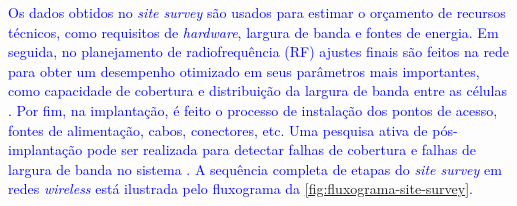 \textcolor{blue}{Os dados obtidos no \textit{site survey} são usados para estimar o orçamento de recursos técnicos, como requisitos de \textit{hardware}, largura de banda e fontes de energia.
Em seguida, no planejamento de radiofrequência (RF) ajustes finais são feitos na rede para obter um desempenho otimizado em seus parâmetros mais importantes, como capacidade de cobertura e distribuição da largura de banda entre as células \cite{kar2018ieee}. Por fim, na implantação, é feito o processo de instalação dos pontos de acesso, fontes de alimentação, cabos, conectores, etc. Uma pesquisa ativa de pós-implantação pode ser realizada para detectar falhas de cobertura e falhas de largura de banda no sistema \cite{kar2018ieee}. A sequência completa de etapas do \textit{site survey} em redes \textit{wireless} está ilustrada pelo fluxograma da \autoref{fig:fluxograma-site-survey}.}

\begin{figure}[H]
	\centering
\end{figure}

